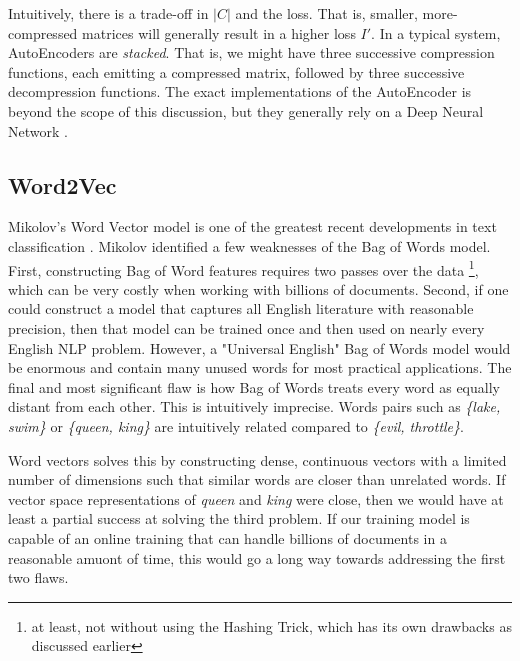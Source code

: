 \par{
Intuitively, there is a trade-off in $|C|$ and the loss. That is, smaller, more-compressed matrices will generally result in a higher loss $I'$. In a typical system, AutoEncoders are \textit{stacked}. That is, we might have three successive compression functions, each emitting a compressed matrix, followed by three successive decompression functions. The exact implementations of the AutoEncoder is beyond the scope of this discussion, but they generally rely on a Deep Neural Network \cite{tensorflow}.
}

\subsection{Word2Vec}

\par{
Mikolov's Word Vector model is one of the greatest recent developments in text classification \cite{word2vec}. Mikolov identified a few weaknesses of the Bag of Words model. First, constructing Bag of Word features requires two passes over the data \footnote{at least, not without using the Hashing Trick, which has its own drawbacks as discussed earlier}, which can be very costly when working with billions of documents. Second, if one could construct a model that captures all English literature with reasonable precision, then that model can be trained once and then used on nearly every English NLP problem. However, a "Universal English" Bag of Words model would be enormous and contain many unused words for most practical applications. The final and most significant flaw is how Bag of Words treats every word as equally distant from each other. This is intuitively imprecise. Words pairs such as \textit{\{\textit{lake}, \textit{swim}\}} or \textit{\{\textit{queen}, \textit{king}\}} are intuitively related compared to \textit{\{\textit{evil}, \textit{throttle}\}}.
}

\par{
Word vectors solves this by constructing dense, continuous vectors with a limited number of dimensions such that similar words are closer than unrelated words. If vector space representations of \textit{queen} and \textit{king} were close, then we would have at least a partial success at solving the third problem. If our training model is capable of an online training that can handle billions of documents in a reasonable amuont of time, this would go a long way towards addressing the first two flaws.
}

